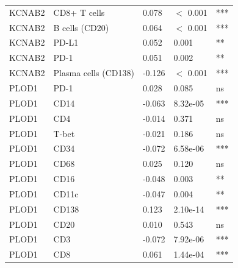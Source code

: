 \documentclass[a4paper,12pt]{article}
\begin{document}
{\begin{longtable}{p{2.5cm}p{4.5cm}p{2.2cm}p{2.2cm}p{2.2cm}}
    KCNAB2   & CD8+ T cells            & 0.078     & $<$ 0.001 & ***                                             \\
    KCNAB2   & B cells (CD20)          & 0.064     & $<$ 0.001 & ***                                             \\
    KCNAB2   & PD-L1                   & 0.052     & 0.001     & **                                              \\
    KCNAB2   & PD-1                    & 0.051     & 0.002     & **                                              \\
    KCNAB2   & Plasma cells (CD138)    & -0.126    & $<$ 0.001 & ***                                             \\
    PLOD1    & PD-1                    & 0.028     & 0.085     & ns                                              \\
    PLOD1    & CD14                    & -0.063    & 8.32e-05  & ***                                             \\
    PLOD1    & CD4                     & -0.014    & 0.371     & ns                                              \\
    PLOD1    & T-bet                   & -0.021    & 0.186     & ns                                              \\
    PLOD1    & CD34                    & -0.072    & 6.58e-06  & ***                                             \\
    PLOD1    & CD68                    & 0.025     & 0.120     & ns                                              \\
    PLOD1    & CD16                    & -0.048    & 0.003     & **                                              \\
    PLOD1    & CD11c                   & -0.047    & 0.004     & **                                              \\
    PLOD1    & CD138                   & 0.123     & 2.10e-14  & ***                                             \\
    PLOD1    & CD20                    & 0.010     & 0.543     & ns                                              \\
    PLOD1    & CD3                     & -0.072    & 7.92e-06  & ***                                             \\
    PLOD1    & CD8                     & 0.061     & 1.44e-04  & ***                                             \\

\end{longtable}}
\end{document}
